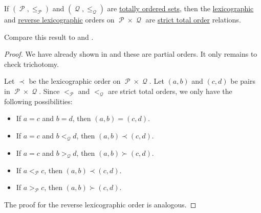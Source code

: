 \begin{proposition}\label{thm:total_lexicographic_order_is_total_order}
  If \( (\mscrP, \leq_\mscrP) \) and \( (\mscrQ, \leq_\mscrQ) \) are \hyperref[def:totally_ordered_set]{totally ordered sets}, then the \hyperref[eq:def:lexicographic_order]{lexicographic} and \hyperref[eq:def:lexicographic_order/reverse]{reverse lexicographic} orders on \( \mscrP \times \mscrQ \) are \hyperref[def:totally_ordered_set]{strict total order} relations.

  Compare this result to  and .
\end{proposition}
\begin{proof}
  We have already shown in  and these are partial orders. It only remains to check trichotomy.

   Let \( \prec \) be the lexicographic order on \( \mscrP \times \mscrQ \). Let \( (a, b) \) and \( (c, d) \) be pairs in \( \mscrP \times \mscrQ \). Since \( <_\mscrP \) and \( <_\mscrQ \) are strict total orders, we only have the following possibilities:
  \begin{itemize}
    \item If \( a = c \) and \( b = d \), then \( (a, b) = (c, d) \).
    \item If \( a = c \) and \( b <_\mscrQ d \), then \( (a, b) \prec (c, d) \).
    \item If \( a = c \) and \( b >_\mscrQ d \), then \( (a, b) \succ (c, d) \).
    \item If \( a <_\mscrP c \), then \( (a, b) \prec (c, d) \).
    \item If \( a >_\mscrP c \), then \( (a, b) \succ (c, d) \).
  \end{itemize}

  The proof for the reverse lexicographic order is analogous.
\end{proof}

